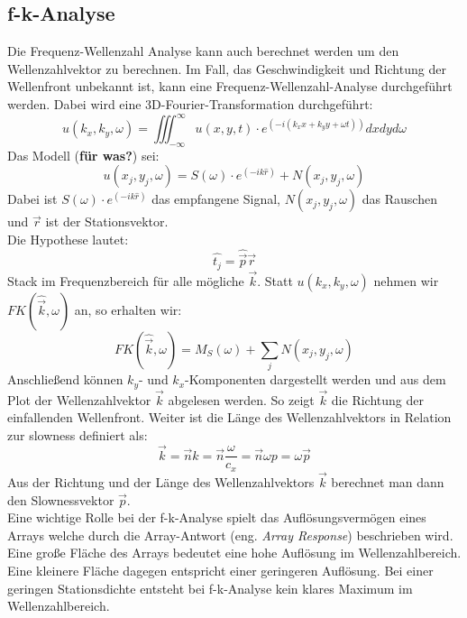 \subsection{f-k-Analyse}
Die Frequenz-Wellenzahl Analyse kann auch berechnet werden um den Wellenzahlvektor zu berechnen.
Im Fall, das Geschwindigkeit und Richtung der Wellenfront unbekannt ist, kann eine Frequenz-Wellenzahl-Analyse durchgeführt werden. Dabei wird eine 3D-Fourier-Transformation durchgeführt:
\begin{equation}
u(k_{x},k_{y},\omega) = \iiint_{-\infty}^{\infty} u(x,y,t)\cdot e^{(-i(k_{x}x+k_{y}y+\omega t))} dxdyd\omega
\end{equation}
Das Modell (\textbf{für was?}) sei:
\[
u(x_{j},y_{j},\omega) = S(\omega)\cdot e^{(-ik\hat{r})}+N(x_{j},y_{j},\omega)
\]
{\small Dabei ist $S(\omega)\cdot e^{({-ik\hat{r}})}$ das empfangene Signal, $N(x_{j},y_{j},\omega)$ das Rauschen und $\vec{r}$ ist der Stationsvektor.}\\
Die Hypothese lautet:
\[
\hat{t_{j}} = \hat{\vec{p}} \vec{r}
\]
Stack im Frequenzbereich für alle mögliche $\vec{k}$.
Statt $u(k_{x}, k_{y}, \omega)$ nehmen wir $FK(\hat{\vec{k}},\omega)$ an, so erhalten wir:
\begin{equation}
FK(\hat{\vec{k}},\omega) = M_S(\omega)+\sum_j N(x_{j},y_{j},\omega)
\end{equation}
Anschließend können $k_{y}$- und $k_{x}$-Komponenten dargestellt werden und aus dem Plot der Wellenzahlvektor $\vec{k}$ abgelesen werden. So zeigt $\vec{k}$ die Richtung der einfallenden Wellenfront.
Weiter ist die Länge des Wellenzahlvektors in Relation zur slowness definiert als:
\begin{equation}
\vec{k} = \vec{n} k = \vec{n} \dfrac{\omega}{c_x} = \vec{n} \omega p= \omega \vec{p} 
\end{equation}
Aus der Richtung und der Länge des Wellenzahlvektors $\vec{k}$ berechnet man dann den Slownessvektor $\vec{p}$.\\
Eine wichtige Rolle bei der f-k-Analyse spielt das Auflösungsvermögen eines Arrays welche durch die Array-Antwort (eng. \textsl{Array Response}) beschrieben wird. Eine große Fläche des Arrays bedeutet eine hohe Auflösung im Wellenzahlbereich. Eine kleinere Fläche dagegen entspricht einer geringeren Auflösung. Bei einer geringen Stationsdichte entsteht bei f-k-Analyse kein klares Maximum im Wellenzahlbereich.

